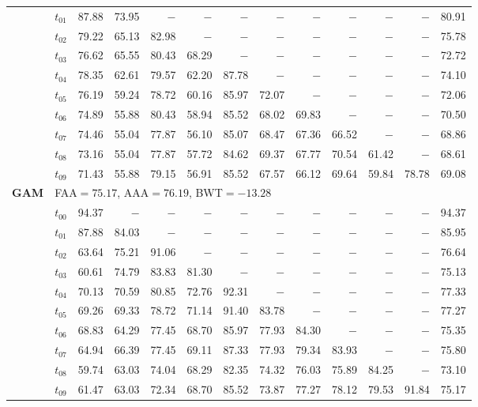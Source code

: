 \begin{table}[ht]
\begin{tabular}{@{}l l r r r r r r r r r r r@{}}
 & $t_{01}$ & 87.88 & 73.95 & $-$ & $-$ & $-$ & $-$ & $-$ & $-$ & $-$ & $-$ & 80.91 \\
 & $t_{02}$ & 79.22 & 65.13 & 82.98 & $-$ & $-$ & $-$ & $-$ & $-$ & $-$ & $-$ & 75.78 \\
 & $t_{03}$ & 76.62 & 65.55 & 80.43 & 68.29 & $-$ & $-$ & $-$ & $-$ & $-$ & $-$ & 72.72 \\
 & $t_{04}$ & 78.35 & 62.61 & 79.57 & 62.20 & 87.78 & $-$ & $-$ & $-$ & $-$ & $-$ & 74.10 \\
 & $t_{05}$ & 76.19 & 59.24 & 78.72 & 60.16 & 85.97 & 72.07 & $-$ & $-$ & $-$ & $-$ & 72.06 \\
 & $t_{06}$ & 74.89 & 55.88 & 80.43 & 58.94 & 85.52 & 68.02 & 69.83 & $-$ & $-$ & $-$ & 70.50 \\
 & $t_{07}$ & 74.46 & 55.04 & 77.87 & 56.10 & 85.07 & 68.47 & 67.36 & 66.52 & $-$ & $-$ & 68.86 \\
 & $t_{08}$ & 73.16 & 55.04 & 77.87 & 57.72 & 84.62 & 69.37 & 67.77 & 70.54 & 61.42 & $-$ & 68.61 \\
 & $t_{09}$ & 71.43 & 55.88 & 79.15 & 56.91 & 85.52 & 67.57 & 66.12 & 69.64 & 59.84 & 78.78 & 69.08 \\
\midrule
\multirow{11}{*}{\textbf{GAM}} & \multicolumn{12}{l}{\quad\small FAA$=75.17$,\; AAA$=76.19$,\; BWT$=-13.28$} \\
 & $t_{00}$ & 94.37 & $-$ & $-$ & $-$ & $-$ & $-$ & $-$ & $-$ & $-$ & $-$ & 94.37 \\
 & $t_{01}$ & 87.88 & 84.03 & $-$ & $-$ & $-$ & $-$ & $-$ & $-$ & $-$ & $-$ & 85.95 \\
 & $t_{02}$ & 63.64 & 75.21 & 91.06 & $-$ & $-$ & $-$ & $-$ & $-$ & $-$ & $-$ & 76.64 \\
 & $t_{03}$ & 60.61 & 74.79 & 83.83 & 81.30 & $-$ & $-$ & $-$ & $-$ & $-$ & $-$ & 75.13 \\
 & $t_{04}$ & 70.13 & 70.59 & 80.85 & 72.76 & 92.31 & $-$ & $-$ & $-$ & $-$ & $-$ & 77.33 \\
 & $t_{05}$ & 69.26 & 69.33 & 78.72 & 71.14 & 91.40 & 83.78 & $-$ & $-$ & $-$ & $-$ & 77.27 \\
 & $t_{06}$ & 68.83 & 64.29 & 77.45 & 68.70 & 85.97 & 77.93 & 84.30 & $-$ & $-$ & $-$ & 75.35 \\
 & $t_{07}$ & 64.94 & 66.39 & 77.45 & 69.11 & 87.33 & 77.93 & 79.34 & 83.93 & $-$ & $-$ & 75.80 \\
 & $t_{08}$ & 59.74 & 63.03 & 74.04 & 68.29 & 82.35 & 74.32 & 76.03 & 75.89 & 84.25 & $-$ & 73.10 \\
 & $t_{09}$ & 61.47 & 63.03 & 72.34 & 68.70 & 85.52 & 73.87 & 77.27 & 78.12 & 79.53 & 91.84 & 75.17 \\

\end{tabular}
\end{table}
